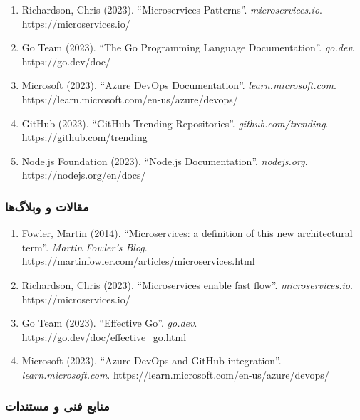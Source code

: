 \documentclass[
]{article}
\begin{document}
\begin{enumerate}
\def\labelenumi{\arabic{enumi}.}
\setcounter{enumi}{11}
\item
  Richardson, Chris (2023). ``Microservices Patterns''.
  \emph{microservices.io}. https://microservices.io/
\item
  Go Team (2023). ``The Go Programming Language Documentation''.
  \emph{go.dev}. https://go.dev/doc/
\item
  Microsoft (2023). ``Azure DevOps Documentation''.
  \emph{learn.microsoft.com}.
  https://learn.microsoft.com/en-us/azure/devops/
\item
  GitHub (2023). ``GitHub Trending Repositories''.
  \emph{github.com/trending}. https://github.com/trending
\item
  Node.js Foundation (2023). ``Node.js Documentation''.
  \emph{nodejs.org}. https://nodejs.org/en/docs/
\end{enumerate}

\subsubsection{مقالات و
وبلاگ‌ها}\label{ux645ux642ux627ux644ux627ux62a-ux648-ux648ux628ux644ux627ux6afux647ux627}

\begin{enumerate}
\def\labelenumi{\arabic{enumi}.}
\setcounter{enumi}{16}
\item
  Fowler, Martin (2014). ``Microservices: a definition of this new
  architectural term''. \emph{Martin Fowler's Blog}.
  https://martinfowler.com/articles/microservices.html
\item
  Richardson, Chris (2023). ``Microservices enable fast flow''.
  \emph{microservices.io}. https://microservices.io/
\item
  Go Team (2023). ``Effective Go''. \emph{go.dev}.
  https://go.dev/doc/effective\_go.html
\item
  Microsoft (2023). ``Azure DevOps and GitHub integration''.
  \emph{learn.microsoft.com}.
  https://learn.microsoft.com/en-us/azure/devops/
\end{enumerate}

\subsubsection{منابع فنی و
مستندات}\label{ux645ux646ux627ux628ux639-ux641ux646ux6cc-ux648-ux645ux633ux62aux646ux62fux627ux62a}
\end{document}
